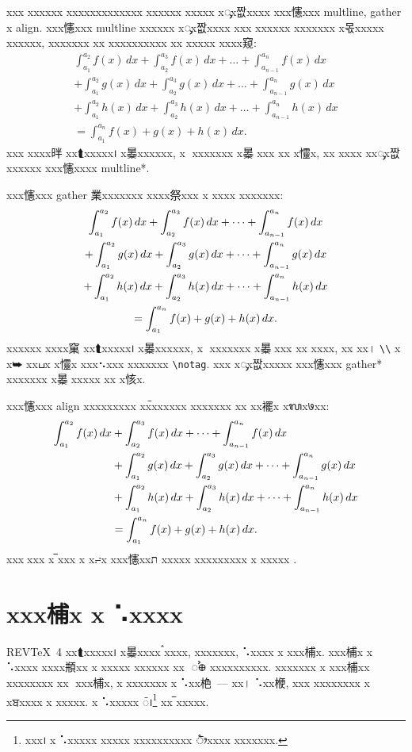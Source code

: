 \documentclass[
aps,%
12pt,%
final,%
notitlepage,%
oneside,%
onecolumn,%
nobibnotes,%
nofootinbib,%
superscriptaddress,%
noshowpacs,%
centertags]%
{revtex4}
\begin{document}
xxx xxxxxx xxxxxxxxxxxxx xxxxxx xxxxx xᯮx짮xxxx xxx㦥xxx
multline, gather x align. xxx㦥xxx multline xxxxxx xᯮx짮xxxx
xxx xxxxxx xxxxxxx x몫xxxxx xxxxxx, xxxxxxx xx xxxxxxxxxx xx
xxxxx xxxx窥:
\begin{multline}
\int_{a_1}^{a_2} f(x)\,dx+\int_{a_2}^{a_3} f(x)\,dx
       +\dots+\int_{a_{n-1}}^{a_n} f(x)\,dx\\
+\int_{a_1}^{a_2} g(x)\,dx+\int_{a_2}^{a_3} g(x)\,dx
       +\dots+\int_{a_{n-1}}^{a_n} g(x)\,dx\\
+\int_{a_1}^{a_2} h(x)\,dx+\int_{a_2}^{a_3} h(x)\,dx
       +\dots+\int_{a_{n-1}}^{a_n} h(x)\,dx\\
       =\int_{a_1}^{a_n} f(x)+g(x)+h(x)\,dx.
\end{multline}
xxx xxxx㫠 xx⮬xxxxx᪨ x㬥xxxxxx, x᫨ xxxxxxx x㬥஢xxx xx
x㦭x, xx xxxx xxᯮx짮xxxxxx xxx㦥xxxx multline*.

xxx㦥xxx gather 業xxxxxxx xxxx祭xxx x xxxx xxxxxxx:
\begin{gather}
\int_{a_1}^{a_2} f(x)\,dx+\int_{a_2}^{a_3} f(x)\,dx
       +\dots+\int_{a_{n-1}}^{a_n} f(x)\,dx\\
+\int_{a_1}^{a_2} g(x)\,dx+\int_{a_2}^{a_3} g(x)\,dx
       +\dots+\int_{a_{n-1}}^{a_n} g(x)\,dx\notag\\
+\int_{a_1}^{a_2} h(x)\,dx+\int_{a_2}^{a_3} h(x)\,dx
       +\dots+\int_{a_{n-1}}^{a_n} h(x)\,dx\\
       =\int_{a_1}^{a_n} f(x)+g(x)+h(x)\,dx.
\end{gather}
xxxxxx xxxx窠 xx⮬xxxxx᪨ x㬥xxxxxx, x᫨ xxxxxxx x㬥஢xxx
xx xxxx, xx xx। \verb+\\+ x x⮩ xxபx x㦭x xxx⠢xxx xxxxxxx
\verb+\notag+. xxx xᯮx짮xxxxx xxx㦥xxx gather* xxxxxxx
x㬥஢xxxxx xx x㤥x.

xxx㦥xxx align xxxxxxxxx xxࠢxxxxxx xxxxxxx xx xx襬x
xᬮx७xx:
\begin{align}
\int_{a_1}^{a_2} f(x)\,dx &+\int_{a_2}^{a_3} f(x)\,dx
       +\dots+\int_{a_{n-1}}^{a_n} f(x)\,dx\notag\\
&+\int_{a_1}^{a_2} g(x)\,dx +\int_{a_2}^{a_3} g(x)\,dx
       +\dots+\int_{a_{n-1}}^{a_n} g(x)\,dx\\
&+\int_{a_1}^{a_2} h(x)\,dx+\int_{a_2}^{a_3} h(x)\,dx
       +\dots+\int_{a_{n-1}}^{a_n} h(x)\,dx\notag\\
       &=\int_{a_1}^{a_n} f(x)+g(x)+h(x)\,dx.
\end{align}
xxx஡xxx x ࠡxxx x x⨬x xxx㦥xxﬨ xxxxx xxxxxxxxx x xxxxx
\cite{GG}.


\section{xxx㭪x x ⠡xxxx}
REV\TeX~4 xx⮬xxxxx᪨ x㬥xxxx ࠧxxxx, xxxxxxx, ⠡xxxx x
xxx㭪x. xxx㭪x x ⠡xxxx xxxx頩xx x xxxxx xxxxxx xx᫥ ᯨ᪠
xxxxxxxxxx. xxxxxxx x xxx㭪xx xxxxxxxx xx᫥ xxx㭪x,  x xxxxxxx
x ⠡xx栬~--- xx। ⠡xx楩, xxx xxxxxxxx x xਬxxxx x xxxxx. x
⠡xxxxx ᭮᪨\footnote{xxx᪨ x ⠡xxxxx xxxxx xxxxxxxxxx
ᤥxxxx xxxxxxx.} xx ࠡxxxxx.
\end{document}
